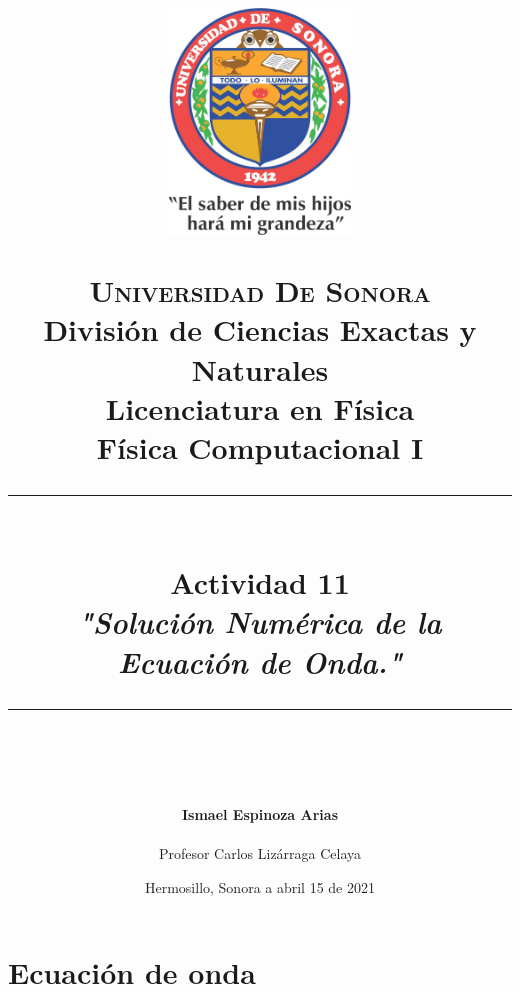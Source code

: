 \documentclass[12pt]{article}
\newcommand{\HRule}[1]{\rule{\linewidth}{#1}}
\begin{document}
\begin{titlepage}

\title{ \normalsize 
        \begin{center}
        \includegraphics[height=6cm]{Logo.jpg}
        \end{center}
        \LARGE \textsc{\textbf{Universidad De Sonora}} \\ \bigskip
		\Large División de Ciencias Exactas y Naturales \\
        Licenciatura en Física \\ \bigskip
        \bigskip
        Física Computacional I
		\\ [0.1cm]  
		\HRule{2pt} \\
		\Large \textbf{{Actividad 11}} \\
        \textit{\textbf{"Solución Numérica de la Ecuación de Onda."}}
		\HRule{2pt} \\
		\normalsize \vspace*{0.001\baselineskip}}
        
\date{\bigskip \Large  \hspace*{\fill} Hermosillo, Sonora a abril 15 de 2021}

        
\author{
		\Large\textbf{Ismael Espinoza Arias} \\ \bigskip
        \\ \bigskip
       \Large Profesor Carlos Lizárraga Celaya}
       \end{titlepage}
       \maketitle
       
       


\section{Ecuación de onda}
\end{document}
